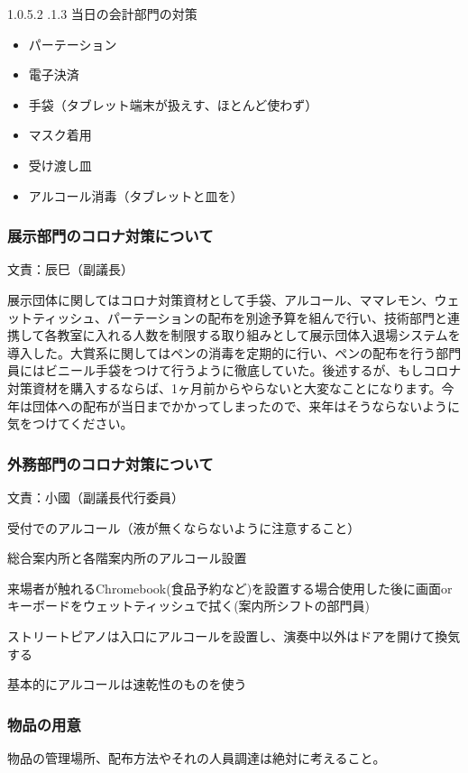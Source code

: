 \documentclass[dvipdfmx,jb5]{jarticle}
\makeatletter
\newcommand{\subsubsubsection}{\@startsection{paragraph}{4}{\z@}%
    {1.0\Cvs \@plus.5\Cdp \@minus.2\Cdp}%
    {.1\Cvs \@plus.3\Cdp}%
    {\large \bfseries}
  }
\makeatother
\begin{document}
\subsubsubsection{当日の会計部門の対策}
\begin{itemize}
  \item パーテーション
  \item 電子決済
  \item 手袋（タブレット端末が扱えす、ほとんど使わず）
  \item マスク着用
  \item 受け渡し皿
  \item アルコール消毒（タブレットと皿を）
\end{itemize}

\subsubsection{展示部門のコロナ対策について} 文責：辰巳（副議長） \vspace{2mm}

展示団体に関してはコロナ対策資材として手袋、アルコール、ママレモン、ウェットティッシュ、パーテーションの配布を別途予算を組んで行い、技術部門と連携して各教室に入れる人数を制限する取り組みとして展示団体入退場システムを導入した。大賞系に関してはペンの消毒を定期的に行い、ペンの配布を行う部門員にはビニール手袋をつけて行うように徹底していた。後述するが、もしコロナ対策資材を購入するならば、1ヶ月前からやらないと大変なことになります。今年は団体への配布が当日までかかってしまったので、来年はそうならないように気をつけてください。

\subsubsection{外務部門のコロナ対策について} 文責：小國（副議長代行委員） \vspace{2mm}

受付でのアルコール（液が無くならないように注意すること）

総合案内所と各階案内所のアルコール設置

来場者が触れるChromebook(食品予約など)を設置する場合使用した後に画面orキーボードをウェットティッシュで拭く(案内所シフトの部門員)

ストリートピアノは入口にアルコールを設置し、演奏中以外はドアを開けて換気する

基本的にアルコールは速乾性のものを使う

\subsubsection{物品の用意}
物品の管理場所、配布方法やそれの人員調達は絶対に考えること。
\end{document}
